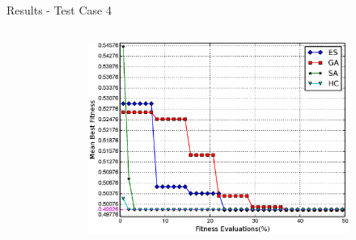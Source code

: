 \documentclass{beamer}
\begin{document}
\begin{frame}{Results - Test Case 4}
\begin{columns}
\begin{column}{.4\columnwidth}
{\begin{tabularx}{\columnwidth}{c *{4}{Y}}
                    \bottomrule
                \end{tabularx}
            }
        \end{column}
        \begin{column}{.6\columnwidth}
            \begin{figure}
                \begin{subfigure}{\columnwidth}
                    \includegraphics[width=\columnwidth, height=\columnwidth]{../paper/FIG/tc4_mf}%
                \end{subfigure}\hfill\\%
            \end{figure}
        \end{column}
    \end{columns}
\end{frame}
\end{document}
